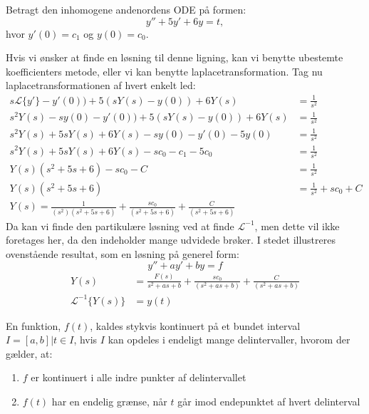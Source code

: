 \begin{Example}
\textnormal{Betragt den inhomogene andenordens ODE på formen:}
$$ y'' + 5y' + 6y = t,$$
\textnormal{hvor $y'(0) = c_1$ og $y(0) = c_0$.}
\hfill \break

\textnormal{Hvis vi ønsker at finde en løsning til denne ligning, kan vi benytte ubestemte koefficienters metode, eller vi kan benytte laplacetransformation.}
\hfill \break
\textnormal{Tag nu laplacetransformationen af hvert enkelt led:}
\begin{align*}
    s\mathcal{L}\{y'\} - y'(0)) + 5(sY(s) - y(0)) + 6Y(s) &= \frac{1}{s^2}\\
    s^2Y(s) - sy(0) - y'(0)) + 5(sY(s) - y(0)) + 6Y(s) &= \frac{1}{s^2}\\
    s^2Y(s) + 5sY(s) + 6Y(s) - sy(0) - y'(0) - 5y(0) &= \frac{1}{s^2}\\
    s^2Y(s) + 5sY(s) + 6Y(s) - sc_0 - c_1 - 5c_0 &= \frac{1}{s^2}\\
    Y(s)(s^2 + 5s + 6) - sc_0 - C &= \frac{1}{s^2}\\
    Y(s)(s^2 + 5s + 6) &= \frac{1}{s^2} + sc_0 + C\\
    Y(s) = \frac{1}{(s^2)(s^2 + 5s + 6)} + \frac{sc_0}{(s^2 + 5s + 6)} + \frac{C}{(s^2 + 5s + 6)}
\end{align*}
\textnormal{Da kan vi finde den partikulære løsning ved at finde $\mathcal{L}^{-1}$, men dette vil ikke foretages her, da den indeholder mange udvidede brøker. I stedet illustreres ovenstående resultat, som en løsning på generel form:}
$$ y'' + ay' + by = f$$
\begin{align*}
    Y(s) &= \frac{F(s)}{s^2 + as + b} + \frac{sc_0}{(s^2 +as +b)} + \frac{C}{(s^2 +as +b)}\\
    \mathcal{L}^{-1}\{Y(s)\} &= y(t)
\end{align*}
\end{Example}

\begin{definition}
En funktion, $f(t)$, kaldes stykvis kontinuert på et bundet interval $I = [a,b] | t \in I$, hvis $I$ kan opdeles i endeligt mange delintervaller, hvorom der gælder, at:
\begin{enumerate}
    \item $f$ er kontinuert i alle indre punkter af delintervallet
    \item $f(t)$ har en endelig grænse, når $t$ går imod endepunktet af hvert delinterval
\end{enumerate}
\end{definition}

